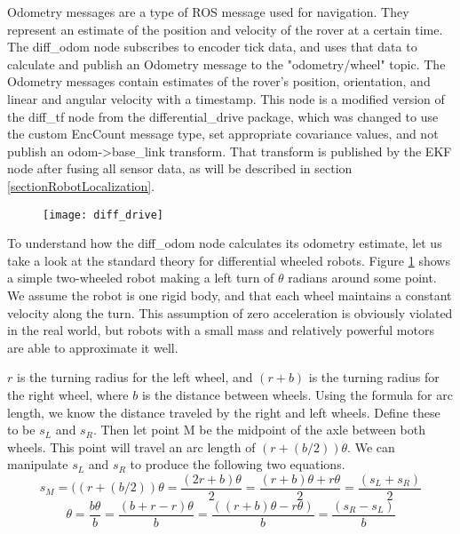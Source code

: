 Odometry messages are a type of ROS message used for navigation. They represent an estimate of the position and velocity of the rover at a certain time. The diff\_odom node subscribes to encoder tick data, and uses that data to calculate and publish an Odometry message to the "odometry/wheel" topic. The Odometry messages contain estimates of the rover's position, orientation, and linear and angular velocity with a timestamp. This node is a modified version of the diff\_tf node from the differential\_drive package, which was changed to use the custom EncCount message type, set appropriate covariance values, and not publish an odom->base\_link transform. That transform is published by the EKF node after fusing all sensor data, as will be described in section \ref{sectionRobotLocalization}.

\begin{figure}[h]
	\caption{\cite{differentialSteeringPaper}}
	\centering
	\texttt{[image: diff\_drive]}
	\label{figDiffDrive}
\end{figure}

To understand how the diff\_odom node calculates its odometry estimate, let us take a look at the standard theory for differential wheeled robots. Figure \ref{figDiffDrive} shows a simple two-wheeled robot making a left turn of \(\theta\) radians around some point. We assume the robot is one rigid body, and that each wheel maintains a constant velocity along the turn. This assumption of zero acceleration is obviously violated in the real world, but robots with a small mass and relatively powerful motors are able to approximate it well. \cite{differentialSteeringPaper}

\(r\) is the turning radius for the left wheel, and \((r+b)\) is the turning radius for the right wheel, where \(b\) is the distance between wheels. Using the formula for arc length, we know the distance traveled by the right and left wheels. Define these to be \(s_L\) and \(s_R\). Then let point M be the midpoint of the axle between both wheels. This point will travel an arc length of \((r+(b/2)) \theta \). We can manipulate \(s_L\) and \(s_R\) to produce the following two equations.
\begin{equation} \label{eqDiffSM}
s_M = ((r+(b/2)) \theta = \frac{(2r + b) \theta}{2} = \frac{(r + b)\theta + r \theta}{2} = \frac{(s_L + s_R)}{2}
\end{equation}
\begin{equation} \label{eqDiffTheta}
\theta = \frac{b\theta}{b} = \frac{(b + r - r) \theta}{b} = \frac{((r+b) \theta - r \theta)}{b} = \frac{(s_R - s_L)}{b}
\end{equation}

